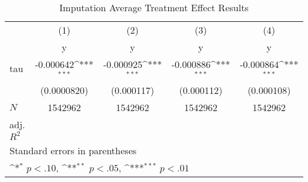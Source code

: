 \begin{table}[htbp]\centering
\def\sym#1{\ifmmode^{#1}\else\(^{#1}\)\fi}
\caption{Imputation Average Treatment Effect Results}
\begin{tabular}{l*{4}{c}}
\hline\hline
            &\multicolumn{1}{c}{(1)}&\multicolumn{1}{c}{(2)}&\multicolumn{1}{c}{(3)}&\multicolumn{1}{c}{(4)}\\
            &\multicolumn{1}{c}{y}&\multicolumn{1}{c}{y}&\multicolumn{1}{c}{y}&\multicolumn{1}{c}{y}\\
\hline
tau         &   -0.000642\sym{***}&   -0.000925\sym{***}&   -0.000886\sym{***}&   -0.000864\sym{***}\\
            & (0.0000820)         &  (0.000117)         &  (0.000112)         &  (0.000108)         \\
\hline
\(N\)       &     1542962         &     1542962         &     1542962         &     1542962         \\
adj. \(R^{2}\)&                     &                     &                     &                     \\
\hline\hline
\multicolumn{5}{l}{\footnotesize Standard errors in parentheses}\\
\multicolumn{5}{l}{\footnotesize \sym{*} \(p<.10\), \sym{**} \(p<.05\), \sym{***} \(p<.01\)}\\
\end{tabular}
\end{table}
